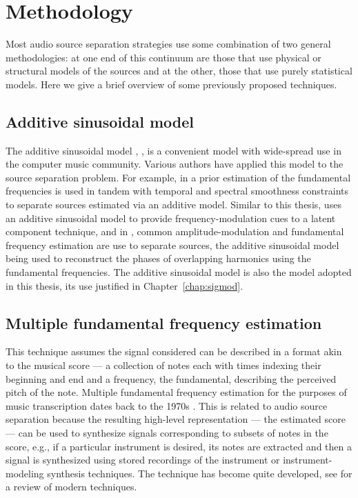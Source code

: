 \chapter{Methodology\label{chap:method}}

Most audio source separation strategies use some combination of two general
methodologies: at one end of this continuum are those that use physical or
structural models of the sources and at the other, those that use purely
statistical models. Here we give a brief overview of some previously proposed
techniques.

\section{Additive sinusoidal model}

The additive sinusoidal model \cite{serra1989system}, \cite{mcaulay1986speech},
is a convenient model with wide-spread use in the computer music community.
Various authors have applied this model to the source separation problem. For
example, in \cite{virtanen2003algorithm} a prior estimation of the fundamental
frequencies is used in tandem with temporal and spectral smoothness constraints
to separate sources estimated via an additive model. Similar to this thesis,
\cite{creager2016musicalsource} uses an additive sinusoidal model to provide
frequency-modulation cues to a latent component technique, and in
\cite{li2009monaural}, common amplitude-modulation and fundamental frequency
estimation are use to separate sources, the additive sinusoidal model being used
to reconstruct the phases of overlapping harmonics using the fundamental
frequencies. The additive sinusoidal model is also the model adopted in this
thesis, its use justified in Chapter~\ref{chap:sigmod}.

\section{Multiple fundamental frequency estimation}

This technique assumes the signal considered can be described in a format akin
to the musical score --- a collection of notes each with times indexing their
beginning and end and a frequency, the fundamental, describing the perceived
pitch of the note. Multiple fundamental frequency estimation for the purposes of music
transcription dates back to the 1970s \cite[ch.~20]{havelock2008handbook}
\cite{moorer1977transcription}. This
is related to audio source separation because the resulting high-level
representation --- the estimated score --- can be used to synthesize signals
corresponding to subsets of
notes in the score, e.g., if a particular instrument is desired, its notes are
extracted and then a signal is synthesized using stored recordings of the
instrument or instrument-modeling synthesis techniques. The technique has become
quite developed, see \cite[ch.~20]{havelock2008handbook} for a review of
modern techniques.

